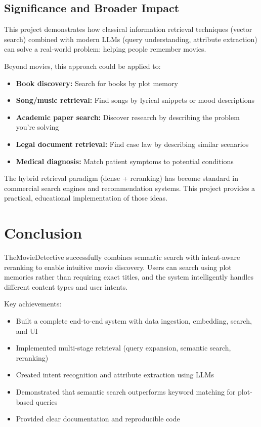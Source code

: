 \documentclass[11pt,a4paper]{article}
\begin{document}
\subsection{Significance and Broader Impact}

This project demonstrates how classical information retrieval techniques (vector search) combined with modern LLMs (query understanding, attribute extraction) can solve a real-world problem: helping people remember movies.

Beyond movies, this approach could be applied to:

\begin{itemize}
    \item \textbf{Book discovery:} Search for books by plot memory
    \item \textbf{Song/music retrieval:} Find songs by lyrical snippets or mood descriptions
    \item \textbf{Academic paper search:} Discover research by describing the problem you're solving
    \item \textbf{Legal document retrieval:} Find case law by describing similar scenarios
    \item \textbf{Medical diagnosis:} Match patient symptoms to potential conditions
\end{itemize}

The hybrid retrieval paradigm (dense + reranking) has become standard in commercial search engines and recommendation systems. This project provides a practical, educational implementation of those ideas.

\section{Conclusion}

TheMovieDetective successfully combines semantic search with intent-aware reranking to enable intuitive movie discovery. Users can search using plot memories rather than requiring exact titles, and the system intelligently handles different content types and user intents.

Key achievements:

\begin{itemize}
    \item Built a complete end-to-end system with data ingestion, embedding, search, and UI
    \item Implemented multi-stage retrieval (query expansion, semantic search, reranking)
    \item Created intent recognition and attribute extraction using LLMs
    \item Demonstrated that semantic search outperforms keyword matching for plot-based queries
    \item Provided clear documentation and reproducible code
\end{itemize}
\end{document}
